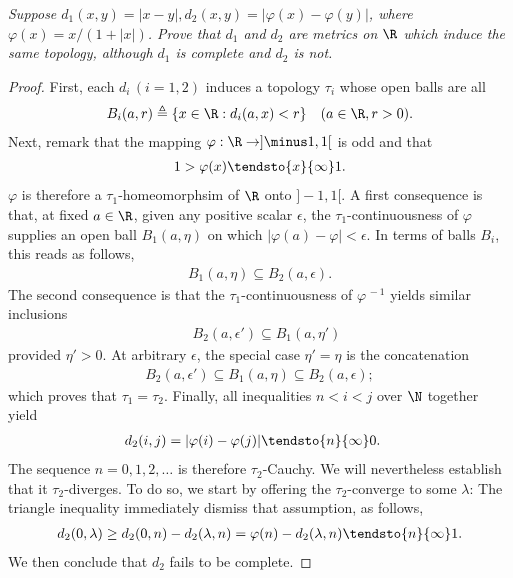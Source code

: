 \textit{Suppose %
%
  $d_1(x,y) = |x-y|, d_2(x,y) = |\varphi(x) - \varphi(y)|$, %
%
where %
%
  $\varphi(x)={x}/{(1+\lvert x \rvert )}$. %
%
Prove that $d_1$ and $d_2$ are metrics on $\R$ which induce the same %
topology, although $d_1$ is complete and $d_2$ is not.
}
%
\begin{proof}%
First, each $d_i\, (i=1, 2)$ induces a topology $\tau_i$ %
whose open balls are all %
%
\begin{align}\label{1_12_2}
  B_i(a,r) \triangleq \{x \in \R: d_i (a, x) < r \} 
  \quad (a \in \R, r > 0 ).
\end{align}
%
Next, remark that the mapping $\varphi: \R \to ]\minus 1, 1[$ is odd and that %
%
\begin{align}\label{1_12_1}
  1> \varphi(x) \tendsto{x}{\infty} 1.
\end{align}
%
$\varphi$ is therefore a $\tau_1$-homeomorphsim of $\R$ onto $]\minus 1, 1[$. %
%
A first consequence is that, at fixed $a \in \R$, given any positive scalar %
$\epsilon$, the $\tau_1$-continuousness of $\varphi$ supplies an open ball %
$B_1(a,\eta)$ on which $|\varphi(a)-\varphi|<\epsilon$. %
In terms of balls $B_i$, this reads as follows, %
%
\begin{align}
  B_1(a,\eta) \subseteq B_2(a,\epsilon).
\end{align}
%
The second consequence is that the $\tau_1$-continuousness of %
$\varphi^{\, \minus 1}$ yields similar inclusions %
%
\begin{align} \label{1_12_6}
\quad B_2(a, \epsilon') \subseteq B_1 (a, \eta')
\end{align}
%
provided $\eta'>0$. At arbitrary $\epsilon$, the special case $\eta' = \eta$ %
is the concatenation %
%
\begin{align}
  B_2(a, \epsilon') \subseteq B_1(a,\eta) \subseteq B_2(a,\epsilon); 
\end{align}
%
which proves that $\tau_1 =\tau_2$. %
%
Finally, all inequalities $n < i < j$ over $\N$ together yield %
%
\begin{align}
  d_2(i, j)=|\varphi(i)-\varphi(j)| \tendsto{n}{\infty} 0.
\quad \end{align}
%
The sequence $n=0, 1, 2, \dots$ is therefore $\tau_2$-Cauchy. We will %
nevertheless establish that it $\tau_2$-diverges. To do so, we start by %
offering the $\tau_2$-converge to some $\lambda$: %
The triangle inequality immediately dismiss that assumption, as follows, %
%
\begin{align}
  d_2(0, \lambda) \geq 
  d_2(0, n) - d_2(\lambda, n) = 
  \varphi(n) -d_2(\lambda, n)  \tendsto{n}{\infty} 1.
\end{align}
%
We then conclude that $d_2$ fails to be complete. 
\end{proof}
